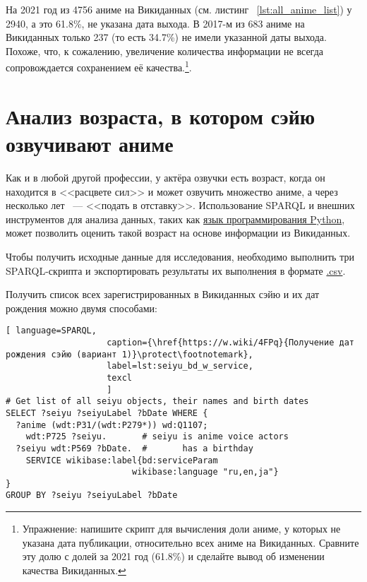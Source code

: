 На 2021 год из \num{4756} аниме на Викиданных (см. листинг ~\protect\ref{lst:all_anime_list}) у \num{2940}, а это \num{61.8}\%, не указана дата выхода. В 2017-м из \num{683} аниме на Викиданных только \num{237} (то есть \num{34.7}\%) не имели указанной даты выхода. Похоже, что, к сожалению, увеличение количества информации не всегда сопровождается сохранением её качества.\footnote{Упражнение: напишите скрипт для вычисления доли аниме, у которых не указана дата публикации, относительно всех аниме на Викиданных. Сравните эту долю с долей за 2021 год (\num{61.8}\%) и сделайте вывод об изменении качества Викиданных.}.

\section{Анализ возраста, в котором сэйю озвучивают аниме}

Как и в любой другой профессии, у актёра озвучки есть возраст, когда он находится в <<расцвете сил>> и может озвучить множество аниме, а через несколько лет ~--- <<подать в отставку>>. Использование SPARQL и внешних инструментов для анализа данных, таких как \href{https://ru.wikipedia.org/wiki/Python}{язык программирования Python}, может позволить оценить такой возраст на основе информации из Викиданных.

Чтобы получить исходные данные для исследования, необходимо выполнить три SPARQL-скрипта и экспортировать результаты их выполнения в формате \href{https://ru.wikipedia.org/wiki/CSV}{.csv}.

Получить список всех зарегистрированных в Викиданных сэйю и их дат рождения можно двумя способами: 

\begin{lstlisting}[ language=SPARQL, 
                    caption={\href{https://w.wiki/4FPq}{Получение дат рождения сэйю (вариант 1)}\protect\footnotemark},
                    label=lst:seiyu_bd_w_service,
                    texcl 
                    ]
# Get list of all seiyu objects, their names and birth dates
SELECT ?seiyu ?seiyuLabel ?bDate WHERE {
  ?anime (wdt:P31/(wdt:P279*)) wd:Q1107;
    wdt:P725 ?seiyu.       # seiyu is anime voice actors
  ?seiyu wdt:P569 ?bDate.  #       has a birthday
    SERVICE wikibase:label{bd:serviceParam
					     wikibase:language "ru,en,ja"}
}
GROUP BY ?seiyu ?seiyuLabel ?bDate
\end{lstlisting}%

